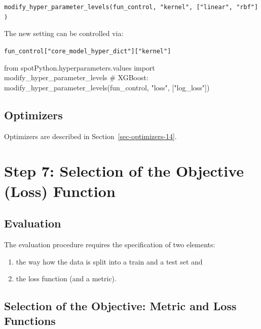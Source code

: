\documentclass[
  letterpaper,
  DIV=11,
  numbers=noendperiod]{scrreprt}
\newenvironment{Shaded}{\begin{snugshade}}{\end{snugshade}}
\newcommand{\CommentTok}[1]{\textcolor[rgb]{0.37,0.37,0.37}{#1}}
\newcommand{\ImportTok}[1]{\textcolor[rgb]{0.00,0.46,0.62}{#1}}
\newcommand{\NormalTok}[1]{\textcolor[rgb]{0.00,0.23,0.31}{#1}}
\newcommand{\StringTok}[1]{\textcolor[rgb]{0.13,0.47,0.30}{#1}}
\providecommand{\tightlist}{%
  \setlength{\itemsep}{0pt}\setlength{\parskip}{0pt}}\usepackage{longtable,booktabs,array}
\begin{document}
\texttt{modify\_hyper\_parameter\_levels(fun\_control,\ "kernel",\ {[}"linear",\ "rbf"{]})}

The new setting can be controlled via:

\texttt{fun\_control{[}"core\_model\_hyper\_dict"{]}{[}"kernel"{]}}

\begin{Shaded}
\begin{Highlighting}[]
\ImportTok{from}\NormalTok{ spotPython.hyperparameters.values }\ImportTok{import}\NormalTok{ modify\_hyper\_parameter\_levels}
\CommentTok{\# XGBoost:}
\NormalTok{modify\_hyper\_parameter\_levels(fun\_control, }\StringTok{"loss"}\NormalTok{, [}\StringTok{"log\_loss"}\NormalTok{])}
\end{Highlighting}
\end{Shaded}

\hypertarget{sec-optimizers-17}{%
\subsection{Optimizers}\label{sec-optimizers-17}}

Optimizers are described in Section~\ref{sec-optimizers-14}.

\hypertarget{step-7-selection-of-the-objective-loss-function-3}{%
\section{Step 7: Selection of the Objective (Loss)
Function}\label{step-7-selection-of-the-objective-loss-function-3}}

\hypertarget{evaluation}{%
\subsection{Evaluation}\label{evaluation}}

The evaluation procedure requires the specification of two elements:

\begin{enumerate}
\def\labelenumi{\arabic{enumi}.}
\tightlist
\item
  the way how the data is split into a train and a test set and
\item
  the loss function (and a metric).
\end{enumerate}

\hypertarget{selection-of-the-objective-metric-and-loss-functions-1}{%
\subsection{Selection of the Objective: Metric and Loss
Functions}\label{selection-of-the-objective-metric-and-loss-functions-1}}
\end{document}
